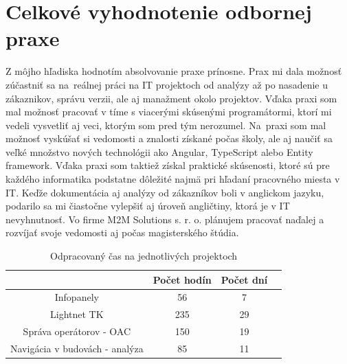 \documentclass[11pt, oneside]{report}
\begin{document}
\section{Celkové vyhodnotenie odbornej praxe}
Z môjho hľadiska  hodnotím absolvovanie praxe prínosne. Prax mi  dala možnosť zúčastniť sa  na~reálnej práci  na IT projektoch od analýzy až po nasadenie u zákaznikov, správu verzii, ale aj manažment okolo projektov. Vďaka praxi som mal možnosť pracovať v tíme s viacerými skúsenými programátormi, ktorí mi vedeli vysvetliť aj veci, ktorým som pred tým nerozumel. Na~praxi som mal možnosť vyskúšať si vedomosti a znalosti získané  počas školy, ale aj naučiť sa  veľké množstvo nových technológii ako Angular, TypeScript alebo Entity framework. Vďaka praxi som taktiež získal praktické skúsenosti, ktoré sú pre každého informatika podstatne dôležité najmä pri hľadaní pracovného miesta v IT. Keďže  dokumentácia aj analýzy od zákazníkov boli v anglickom jazyku, podarilo sa mi čiastočne vylepšiť aj úroveň angličtiny, ktorá je v IT nevyhnutnosť. Vo firme M2M Solutions s. r. o. plánujem pracovať naďalej  a rozvíjať svoje vedomosti aj počas magisterského štúdia.\\
\begin{table}[h!]
\centering
\begin{tabular}{|c | c | c | c|} 
 \hline
  & Počet hodín & Počet dní\\ [0.5ex] 
 \hline
 Infopanely & 56 & 7  \\ 
Lightnet TK & 235 & 29  \\
Správa operátorov - OAC & 150 & 19  \\
 Navigácia v budovách - analýza& 85 & 11   \\
 \hline
\end{tabular}
\label{tabHodiny}
\caption{Odpracovaný čas na jednotlivých projektoch}
\end{table}


\newpage
\thispagestyle{empty}
\nocite{*}
\clearpage

\printbibliography[title={Literatúra}]
\end{document}
